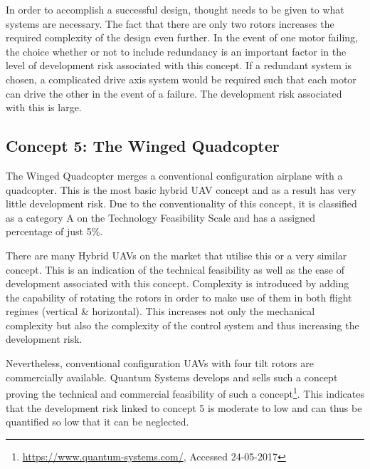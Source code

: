 In order to accomplish a successful design, thought needs to be given to what systems are necessary. The fact that there are only two rotors increases the required complexity of the design even further. In the event of one motor failing, the choice whether or not to include redundancy is an important factor in the level of development risk associated with this concept. If a redundant system is chosen, a complicated drive axis system would be required such that each motor can drive the other in the event of a failure. The development risk associated with this is large. 

\subsection{Concept 5: The Winged Quadcopter}
The Winged Quadcopter merges a conventional configuration airplane with a quadcopter. This is the most basic hybrid UAV concept and as a result has very little development risk. Due to the conventionality of this concept, it is classified as a category A on the Technology Feasibility Scale and has a assigned percentage of just 5\%.

There are many Hybrid UAVs on the market that utilise this or a very similar concept. This is an indication of the technical feasibility as well as the ease of development associated with this concept. Complexity is introduced by adding the capability of rotating the rotors in order to make use of them in both flight regimes (vertical \& horizontal). This increases not only the mechanical complexity but also the complexity of the control system and thus increasing the development risk.

Nevertheless, conventional configuration UAVs with four tilt rotors are commercially available. Quantum Systems develops and sells such a concept proving the technical and commercial feasibility of such a concept\footnote{\url{https://www.quantum-systems.com/}, Accessed 24-05-2017}. This indicates that the development risk linked to concept 5 is moderate to low and can thus be quantified so low that it can be neglected.


